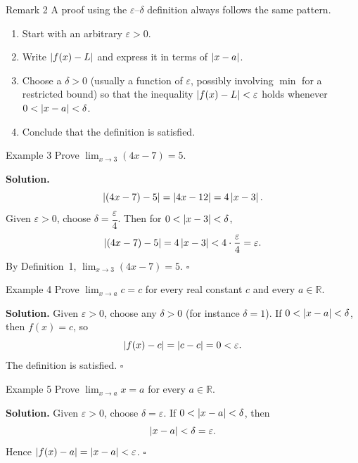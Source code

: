 \begin{remarkbox}{Remark 2}
A proof using the \(\varepsilon\)--\(\delta\) definition always follows the same pattern.
\begin{enumerate}
    \item Start with an arbitrary \(\varepsilon > 0\).
    \item Write \(\left|f(x)-L\right|\) and express it in terms of \(\left|x-a\right|\).
    \item Choose a \(\delta > 0\) (usually a function of \(\varepsilon\), possibly involving \(\min\) for a restricted bound) so that the inequality \(\left|f(x)-L\right|<\varepsilon\) holds whenever \(0<\left|x-a\right|<\delta\).
    \item Conclude that the definition is satisfied.
\end{enumerate}
\end{remarkbox}

\begin{examplebox}{Example 3}
Prove \(\displaystyle\lim_{x \to 3} (4x - 7) = 5\).

\medskip
\textbf{Solution.}
\[
\left|(4x - 7) - 5\right| = \left|4x - 12\right| = 4\left|x - 3\right|.
\]
Given \(\varepsilon > 0\), choose \(\delta = \dfrac{\varepsilon}{4}\). Then for \(0 < \left|x - 3\right| < \delta\),
\[
\left|(4x - 7) - 5\right| = 4\left|x - 3\right| < 4 \cdot \frac{\varepsilon}{4} = \varepsilon.
\]
By Definition~1, \(\displaystyle\lim_{x \to 3} (4x - 7) = 5\). \(\square\)
\end{examplebox}

\begin{examplebox}{Example 4}
Prove \(\displaystyle\lim_{x \to a} c = c\) for every real constant \(c\) and every \(a \in \mathbb{R}\).

\medskip
\textbf{Solution.}
Given \(\varepsilon > 0\), choose any \(\delta > 0\) (for instance \(\delta = 1\)). If \(0 < \left|x - a\right| < \delta\), then \(f(x) = c\), so
\[
\left|f(x) - c\right| = \left|c - c\right| = 0 < \varepsilon.
\]
The definition is satisfied. \(\square\)
\end{examplebox}

\begin{examplebox}{Example 5}
Prove \(\displaystyle\lim_{x \to a} x = a\) for every \(a \in \mathbb{R}\).

\medskip
\textbf{Solution.}
Given \(\varepsilon > 0\), choose \(\delta = \varepsilon\). If \(0 < \left|x - a\right| < \delta\), then
\[
\left|x - a\right| < \delta = \varepsilon.
\]
Hence \(\left|f(x) - a\right| = \left|x - a\right| < \varepsilon\). \(\square\)
\end{examplebox}

